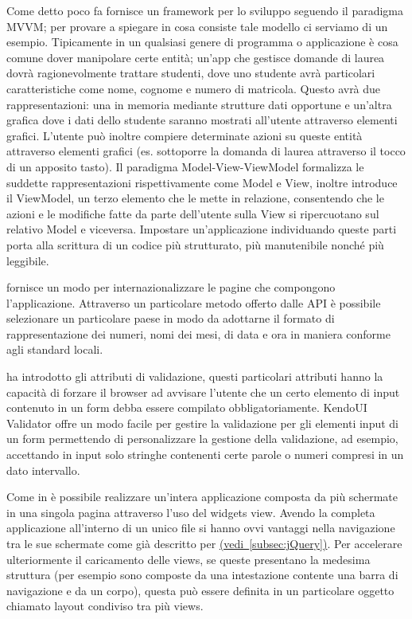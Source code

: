 			Come detto poco fa \kendomob{} fornisce un framework per lo
			sviluppo seguendo il paradigma MVVM; per provare a spiegare in cosa
			consiste tale modello ci serviamo di un esempio. Tipicamente in un
			qualsiasi genere di programma o applicazione è cosa comune dover
			manipolare certe entità; un'app che gestisce domande di laurea dovrà
			ragionevolmente trattare studenti, dove uno studente avrà 
			particolari caratteristiche come nome, cognome e numero di matricola.
			Questo avrà due rappresentazioni: una in memoria mediante strutture
			dati opportune e un'altra grafica dove i dati dello studente saranno
			mostrati all'utente attraverso elementi grafici. L'utente può
			inoltre compiere determinate azioni su queste entità attraverso
			elementi grafici (es. sottoporre la domanda di laurea attraverso
			il tocco di un apposito tasto). Il paradigma Mo\-del-\-View-\-View\-Mo\-del 
			formalizza le suddette rappresentazioni rispettivamente come Model e 
			View, inoltre introduce il ViewModel, un terzo elemento che le mette 
			in relazione, consentendo che le azioni e le modifiche fatte da
			parte dell'utente sulla View si ripercuotano sul relativo Model e
			viceversa. Impostare un'applicazione individuando queste parti
			porta alla scrittura di un codice più strutturato, più manutenibile
			nonché più leggibile.
			
			\kendomob{} fornisce un modo per internazionalizzare le pagine che 
			compongono l'applicazione. Attraverso un particolare metodo offerto
			dalle API è possibile selezionare un particolare paese in modo da
			adottarne il formato di rappresentazione dei numeri, nomi dei mesi,  
			di data e ora in maniera conforme agli standard locali.
	
			 ha introdotto gli attributi di validazione, questi particolari 
			attributi hanno la capacità di forzare il browser ad avvisare
			l'utente che un certo elemento di input contenuto in un form debba
			essere compilato obbligatoriamente.	KendoUI Validator offre un modo
			facile per gestire la validazione per gli elementi input di un form
			permettendo di personalizzare la gestione della validazione, ad
			esempio, accettando in input solo stringhe contenenti certe parole o
			numeri compresi in un dato intervallo.
			
			Come in \jqm{} è possibile realizzare un'intera applicazione
			composta da più schermate in una singola pagina \html{} attraverso l'uso
			del widgets view. Avendo la completa applicazione all'interno di un
			unico file si hanno ovvi vantaggi nella navigazione tra le sue schermate
			come già descritto per \jqm{}
			\hyperref[subsec:jQuery]{(vedi~\ref{subsec:jQuery})}.
			Per accelerare ulteriormente il caricamento delle views, se queste
			presentano la medesima struttura (per esempio sono composte da una
			intestazione contente una barra di navigazione e da un corpo),
			questa può essere definita in un particolare oggetto chiamato layout
			condiviso tra più views.
			

